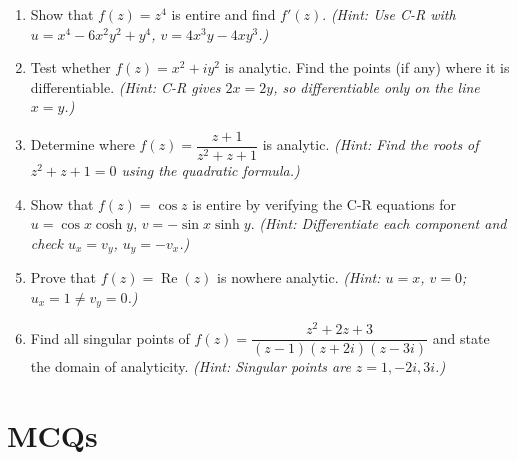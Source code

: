 \documentclass[12pt,a4paper]{article}
\begin{document}
\begin{enumerate}
  \item Show that $f(z) = z^{4}$ is entire and find $f'(z)$.
        \textit{(Hint: Use C-R with $u = x^4 - 6x^2y^2 + y^4$, $v = 4x^3y - 4xy^3$.)}

  \item Test whether $f(z) = x^{2} + iy^{2}$ is analytic. Find the points (if
        any) where it is differentiable.
        \textit{(Hint: C-R gives $2x = 2y$, so differentiable only on the line $x = y$.)}

  \item Determine where $f(z) = \dfrac{z+1}{z^{2}+z+1}$ is analytic.
        \textit{(Hint: Find the roots of $z^{2}+z+1 = 0$ using the quadratic formula.)}

  \item Show that $f(z) = \cos z$ is entire by verifying the C-R equations for
        $u = \cos x\cosh y$, $v = -\sin x\sinh y$.
        \textit{(Hint: Differentiate each component and check $u_x = v_y$, $u_y = -v_x$.)}

  \item Prove that $f(z) = \operatorname{Re}(z)$ is nowhere analytic.
        \textit{(Hint: $u = x$, $v = 0$; $u_x = 1 \neq v_y = 0$.)}

  \item Find all singular points of $f(z) = \dfrac{z^{2}+2z+3}{(z-1)(z+2i)(z-3i)}$
        and state the domain of analyticity.
        \textit{(Hint: Singular points are $z = 1, -2i, 3i$.)}
\end{enumerate}

\section{MCQs}
\end{document}
